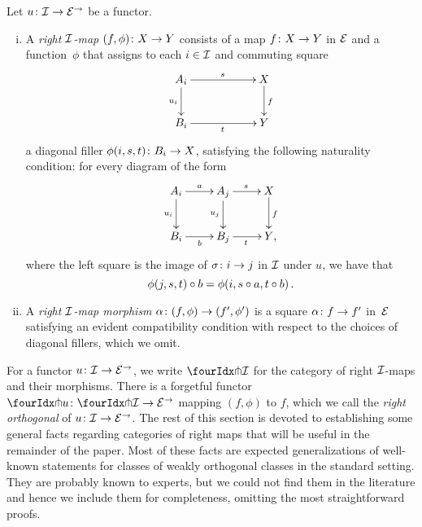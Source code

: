 \documentclass[reqno,10pt,a4paper,oneside,draft]{amsart}
\begin{document}
\begin{definition} \label{def:right-map}
Let $u \co \cal{I} \to \catE^\to$ be a functor.
\begin{enumerate}[(i)]
\item A \emph{right $\cal{I}$-map} $(f, \phi) \co X \to Y$ consists of a map $f \co X \to Y$ in $\catE$ and a function~$\phi$ that assigns to each $i \in \cal{I}$ and commuting square
\[
\xymatrix@C=2cm{
  A_i
  \ar[r]^{s}
  \ar[d]_{u_i}
&
  X
  \ar[d]^f
\\
  B_i
  \ar[r]_{t}
&
  Y
}
\]
a diagonal filler $\phi(i,s, t) \co B_i \to X$, satisfying the following naturality condition: for every diagram of the form
\[
\xymatrix{
  A_i
  \ar[r]^{a}
  \ar[d]_{u_i}
&
  A_j
  \ar[r]^{s}
  \ar[d]_{u_j}
&
  X
  \ar[d]^f
\\
  B_i
  \ar[r]_{b}
&
  B_j
  \ar[r]_{t}
&
  Y
\rlap{,}}
\]
where the left square is the image of $\sigma \co i \to j$ in $\cal{I}$ under $u$, we have that
\[
  \phi(j, s, t) \cc b = \phi(i, s \cc a, t \cc b) \, .
\]
\item A \emph{right $\cal{I}$-map morphism} $\alpha \co (f, \phi) \to (f', \phi')$ is a square $\alpha \co f \to f'$ in~$\catE$ satisfying an evident compatibility condition with respect to the choices of diagonal fillers, which we omit.
\end{enumerate}
\end{definition}

For a functor $u \co \cal{I} \to \catE^\to$, we write $\liftr{\cal{I}}$ for the category of right $\cal{I}$-maps and their morphisms.
There is a forgetful functor~$\liftr{u} \co \liftr{\cal{I}} \to \catE^\to$ mapping $(f, \phi)$ to $f$, which we call the \emph{right orthogonal} of $u \co \cal{I} \to \catE^\to$.
The rest of this section is devoted to establishing some general facts regarding categories of right maps that will be useful in the remainder of the paper.
Most of these facts are expected generalizations of well-known statements for classes of weakly orthogonal classes in the standard setting.
They are probably known to experts, but we could not find them in the literature and hence we include them for completeness, omitting the most straightforward proofs.
\end{document}
